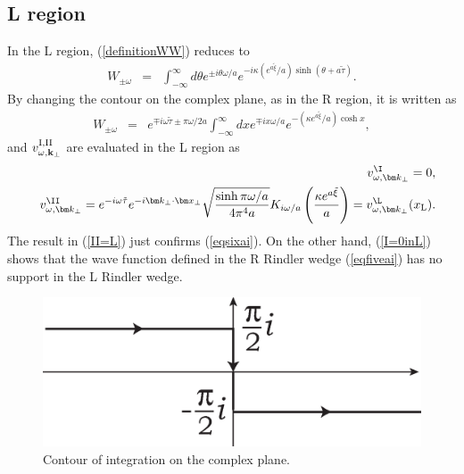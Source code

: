 \documentclass[aps,prd,preprintnumbers,nofootinbib,showpacs]{revtex4}%
\begin{document}
\begin{widetext}
\subsection{L region}
In the L region, (\ref{definitionWW}) reduces to 
\begin{eqnarray}
W_{\pm \omega}&=&\int_{-\infty}^{\infty} {d\theta }e^{\pm i\theta\omega/a} e^{-i\kappa (e^{a\tilde\xi}/a)\sinh (\theta+a\tilde\tau) }.
\label{definitionWL}
\end{eqnarray}
By changing the contour on the complex plane, as in the R region,
it is written as
\begin{eqnarray}
W_{\pm \omega}&=&e^{\mp i\omega\tilde\tau\pm \pi\omega/2a}\int_{-\infty}^{\infty} {dx }e^{\mp ix\omega/a} 
e^{-(\kappa e^{a\tilde\xi}/a)\cosh x},
\label{definitionWR2}
\end{eqnarray}
and $v^{\rm I, II}_{\omega, {\bf k}_\perp}$ are evaluated in the L region as
\begin{eqnarray}
&&v^{\I}_{\omega,\bm k_\perp}=0,
\label{I=0inL}
\\
&&v^{\II}_{\omega,\bm k_\perp}=e^{-i\omega\tilde\tau} e^{-i\bm k_\perp\cdot \bm x_\perp}\sqrt{\sinh \pi\omega/a \over 4\pi^4 a}
K_{i\omega/a}\left({\kappa e^{a\tilde \xi} \over a}\right)
=v^{\L}_{\omega,\bm k_\perp}(x_{\rm L}).
\label{II=L}
\end{eqnarray}
The result in (\ref{II=L}) just confirms (\ref{eqsixai}).
On the other hand, (\ref{I=0inL}) shows that the wave function defined in the R 
Rindler wedge (\ref{eqfiveai}) has no support in the L Rindler wedge.
\begin{figure}[b]
\begin{center}
    \includegraphics[width=6.cm]{fig2.eps}
\caption{Contour of integration on the complex plane.
\label{CPcont}}
\end{center}
\end{figure}

\end{widetext}
\end{document}
